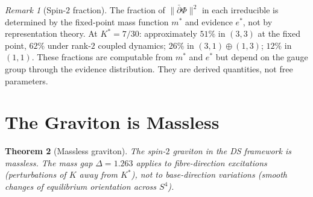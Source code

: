 \documentclass[11pt,a4paper]{article}
\newtheorem{theorem}{Theorem}[section]
\theoremstyle{definition}
\theoremstyle{remark}
\newtheorem{remark}[theorem]{Remark}
\newcommand{\dbar}{\bar{\partial}}
\begin{document}
\begin{remark}[Spin-$2$ fraction]
The fraction of $\|\dbar\Phi\|^2$ in each irreducible is determined by the fixed-point mass function $m^*$ and evidence $e^*$, not by representation theory. At $K^*=7/30$: approximately $51\%$ in $(3,3)$ at the fixed point, $62\%$ under rank-$2$ coupled dynamics; $26\%$ in $(3,1)\oplus(1,3)$; $12\%$ in $(1,1)$. These fractions are computable from $m^*$ and $e^*$ but depend on the gauge group through the evidence distribution. They are derived quantities, not free parameters.
\end{remark}


\section{The Graviton is Massless}\label{sec:massless_graviton}

\begin{theorem}[Massless graviton]\label{thm:massless_graviton}
The spin-$2$ graviton in the DS framework is massless. The mass gap $\Delta=1.263$ applies to fibre-direction excitations (perturbations of $K$ away from $K^*$), not to base-direction variations (smooth changes of equilibrium orientation across $S^4$).
\end{theorem}
\end{document}
